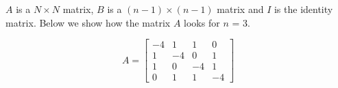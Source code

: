 $A$ is a $N \times N$ matrix, $B$ is a $(n-1) \times (n-1)$ matrix and 
$I$ is the identity matrix. Below we show how the matrix $A$ looks for 
$n$ = 3.

$$
A = \begin{bmatrix}
 -4 &  1 &  1 &  0 \\
  1 & -4 &  0 &  1 \\
  1 &  0 & -4 &  1 \\
  0 &  1 &  1 & -4
\end{bmatrix}
$$
